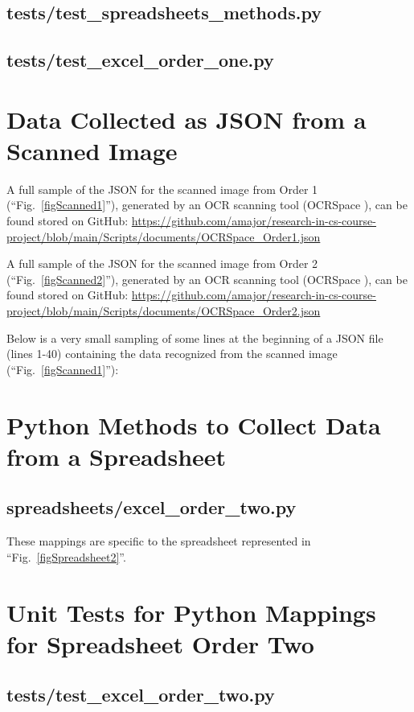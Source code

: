 \documentclass[conference]{IEEEtran}
\begin{document}
    \subsection{tests/test\_spreadsheets\_methods.py}
    

    \newpage
    \subsection{tests/test\_excel\_order\_one.py}
    

\newpage
\section{Data Collected as JSON from a Scanned Image} \label{appendixOrderOneJSON}
A full sample of the JSON for the scanned image from Order 1 (``Fig.~\ref{figScanned1}''), generated by an OCR scanning tool (OCRSpace \cite{ocrspace}), can be found stored on GitHub: \url{https://github.com/amajor/research-in-cs-course-project/blob/main/Scripts/documents/OCRSpace\_Order1.json}

A full sample of the JSON for the scanned image from Order 2 (``Fig.~\ref{figScanned2}''), generated by an OCR scanning tool (OCRSpace \cite{ocrspace}), can be found stored on GitHub: \url{https://github.com/amajor/research-in-cs-course-project/blob/main/Scripts/documents/OCRSpace\_Order2.json}

Below is a very small sampling of some lines at the beginning of a JSON file (lines 1-40) containing the data recognized from the scanned image (``Fig.~\ref{figScanned1}''):


% 

\newpage
\section{Python Methods to Collect Data from a Spreadsheet} \label{appendixOrderTwo}
    \subsection{spreadsheets/excel\_order\_two.py}
    These mappings are specific to the spreadsheet represented in ``Fig.~\ref{figSpreadsheet2}''.
    

\newpage
\section{Unit Tests for Python Mappings for Spreadsheet Order Two} \label{appendixOrderTwoTests}
    \subsection{tests/test\_excel\_order\_two.py}
    
\end{document}
